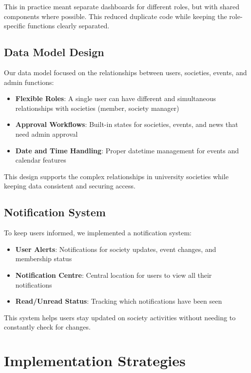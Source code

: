 This in practice meant separate dashboards for different roles, but with shared components where possible. This reduced duplicate code while keeping the role-specific functions clearly separated.

\subsection{Data Model Design}

Our data model focused on the relationships between users, societies, events, and admin functions:

\begin{itemize}
    \item \textbf{Flexible Roles}: A single user can have different and simultaneous relationships with societies (member, society manager)
    \item \textbf{Approval Workflows}: Built-in states for societies, events, and news that need admin approval
    \item \textbf{Date and Time Handling}: Proper datetime management for events and calendar features
\end{itemize}

This design supports the complex relationships in university societies while keeping data consistent and securing access.

\subsection{Notification System}

To keep users informed, we implemented a notification system:

\begin{itemize}
    \item \textbf{User Alerts}: Notifications for society updates, event changes, and membership status
    \item \textbf{Notification Centre}: Central location for users to view all their notifications
    \item \textbf{Read/Unread Status}: Tracking which notifications have been seen
\end{itemize}

This system helps users stay updated on society activities without needing to constantly check for changes.

\section{Implementation Strategies}

